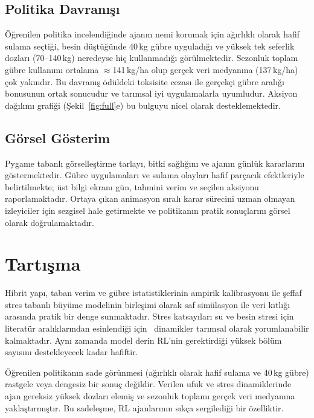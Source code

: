 \documentclass[10pt,twocolumn,a4paper]{article}
\begin{document}
\subsection{Politika Davran{\i}\c{s}{\i}}
\"O\u{g}renilen politika incelendi\u{g}inde ajan{\i}n nemi korumak i\c{c}in a\u{g}{\i}rl{\i}kl{\i} olarak hafif sulama se\c{c}ti\u{g}i, besin d\"u\c{s}t\"u\u{g}\"unde 40\,kg g\"ubre uygulad{\i}\u{g}{\i} ve y\"uksek tek seferlik dozlar{\i} (70--140\,kg) neredeyse hi\c{c} kullanmad{\i}\u{g}{\i} g\"or\"ulmektedir. Sezonluk toplam g\"ubre kullan{\i}m{\i} ortalama $\approx$141\,kg/ha olup ger\c{c}ek veri medyan{\i}na (137\,kg/ha) \c{c}ok yak{\i}nd{\i}r. Bu davran{\i}\c{s} \"od\"uldeki toksisite cezas{\i} ile ger\c{c}ek\c{c}i g\"ubre aral{\i}\u{g}{\i} bonusunun ortak sonucudur ve tar{\i}msal iyi uygulamalarla uyumludur. Aksiyon da\u{g}{\i}l{\i}m{\i} grafi\u{g}i (\c{S}ekil~\ref{fig:full}e) bu bulguyu nicel olarak desteklemektedir.

\subsection{G\"orsel G\"osterim}
Pygame tabanl{\i} g\"orselle\c{s}tirme tarlay{\i}, bitki sa\u{g}l{\i}\u{g}{\i}n{\i} ve ajan{\i}n g\"unl\"uk kararlar{\i}n{\i} g\"ostermektedir. G\"ubre uygulamalar{\i} ve sulama olaylar{\i} hafif par\c{c}ac{\i}k efektleriyle belirtilmekte; \"ust bilgi ekran{\i} g\"un, tahmini verim ve se\c{c}ilen aksiyonu raporlamaktad{\i}r. Ortaya \c{c}{\i}kan animasyon s{\i}ral{\i} karar s\"urecini uzman olmayan izleyiciler i\c{c}in sezgisel hale getirmekte ve politikan{\i}n pratik sonu\c{c}lar{\i}n{\i} g\"orsel olarak do\u{g}rulamaktad{\i}r.

\section{Tart{\i}\c{s}ma}
Hibrit yap{\i}, taban verim ve g\"ubre istatistiklerinin ampirik kalibrasyonu ile \c{s}effaf stres tabanl{\i} b\"uy\"ume modelinin birle\c{s}imi olarak saf sim\"ulasyon ile veri k{\i}tl{\i}\u{g}{\i} aras{\i}nda pratik bir denge sunmaktad{\i}r. Stres katsay{\i}lar{\i} su ve besin stresi i\c{c}in literat\"ur aral{\i}klar{\i}ndan esinlendi\u{g}i i\c{c}in~\cite{doorenbos1979,raes2009aquacrop} dinamikler tar{\i}msal olarak yorumlanabilir kalmaktad{\i}r. Ayn{\i} zamanda model derin RL'nin gerektirdi\u{g}i y\"uksek b\"ol\"um say{\i}s{\i}n{\i} destekleyecek kadar hafiftir.

\"O\u{g}renilen politikan{\i}n sade g\"or\"unmesi (a\u{g}{\i}rl{\i}kl{\i} olarak hafif sulama ve 40\,kg g\"ubre) rastgele veya dengesiz bir sonu\c{c} de\u{g}ildir. Verilen ufuk ve stres dinamiklerinde ajan gereksiz y\"uksek dozlar{\i} elemi\c{s} ve sezonluk toplam{\i} ger\c{c}ek veri medyan{\i}na yakla\c{s}t{\i}rm{\i}\c{s}t{\i}r. Bu sadele\c{s}me, RL ajanlar{\i}n{\i}n s{\i}k\c{c}a sergiledi\u{g}i bir \"ozelliktir.
\end{document}
